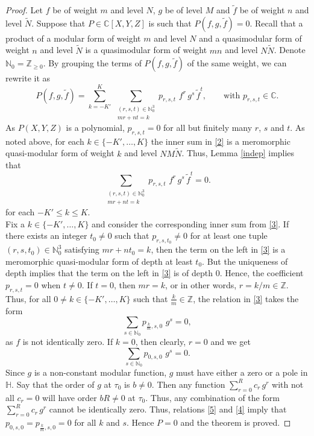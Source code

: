 \documentclass[11pt, reqno]{amsart}
\begin{document}
\begin{proof}
Let $f$ be of weight $m$ and level $N$, $g$ be of level $M$ and $\widetilde{f}$ be of weight $n$ and level $\widetilde{N}$. Suppose that $P\in \mathbb{C}[X,Y,Z]$ is such that $P(f,g,\widetilde{f})=0$. Recall that a product of a modular form of weight $m$ and level $N$ and a quasimodular form of weight $n$ and level $\widetilde{N}$ is a quasimodular form of weight $mn$ and level $N\widetilde{N}$. Denote $\mathbb{N}_0 = \mathbb{Z}_{\geq 0}$. By grouping the terms of $P(f,g,\widetilde{f})$ of the same weight, we can rewrite it as
\begin{equation}\label{2}
P(f,g,\widetilde{f})=\sum_{k=-K'}^K\,\sum_{\substack{{(r,s,t)\in\mathbb{N}_{0}^3}\\ {mr+nt=k}}} p_{r,s,t} \, \, f^r\,g^s\,{\widetilde{f}}^t , \qquad \text{with   } p_{r,s,t} \in \mathbb{C}.
 \end{equation} 
As $P(X,Y,Z)$ is a polynomial, $p_{r,s,t}=0$ for all but finitely many $r$, $s$ and $t$. As noted above, for each $k\in \{-K',\ldots,K\}$ the inner sum in \eqref{2} is a meromorphic quasi-modular form of weight $k$ and level $NM\widetilde{N}$. Thus, Lemma \ref{indep} implies that
\begin{equation}\label{3}
\sum_{\substack{{(r,s,t)\in\mathbb{N}_0^3}\\ {mr+nt=k}}} p_{r,s,t} \,\, f^r\,g^s\,{\widetilde{f}}^t=0.
\end{equation}
 for each $-K'\leq k\leq K$. \\
 
\noindent Fix a $k\in\{-K',\ldots,K\} $ and consider the corresponding inner sum from \eqref{3}. If there exists an integer $t_0\neq 0$ such that $p_{r,s,t_0}\neq 0$ for at least one tuple $(r,s,t_0)\in\mathbb{N}_0^3$ satisfying $mr+nt_0=k$, then the term on the left in \eqref{3}
is a meromorphic quasi-modular form of depth at least $t_0$. But the uniqueness of depth implies that the term on the left in \eqref{3} is of depth $0$. Hence, the coefficient $p_{r,s,t}=0$ when $t\neq 0$. If $t=0$, then $mr=k$, or in other words, $r = k/m \in \mathbb{Z}$. Thus, for all $0 \neq k\in\{-K',\ldots, K\}$ such that $\frac{k}{m}\in\mathbb{Z}$, the relation in \eqref{3} takes the form  
\begin{equation}\label{5}
\sum_{s \in \mathbb{N}_0} p_{\frac{k}{m},s,0} \,\,g^s = 0,
\end{equation}
as $f$ is not identically zero. If $k=0$, then clearly, $r=0$ and we get
\begin{equation}\label{4}
    \sum_{s \in \mathbb{N}_0} p_{0,s,0} \, \, g^s=0.
\end{equation}
Since $g$ is a non-constant modular function, $g$ must have either a zero or a pole in $\mathbb{H}$. Say that the order of $g$ at $\tau_0$ is $b \neq 0$. Then any function $\sum_{r=0}^R c_r\, g^r$ with not all $c_r = 0$ will have order $bR \neq 0$ at $\tau_0$. Thus, any combination of the form  $\sum_{r=0}^R c_r\, g^r$ cannot be identically zero. Thus, relations \eqref{5} and \eqref{4} imply that $p_{0,s,0}=p_{\frac{k}{m},s,0}=0$ for all $k$ and $s$. Hence $P=0$ and the theorem is proved.
\end{proof}
\end{document}
